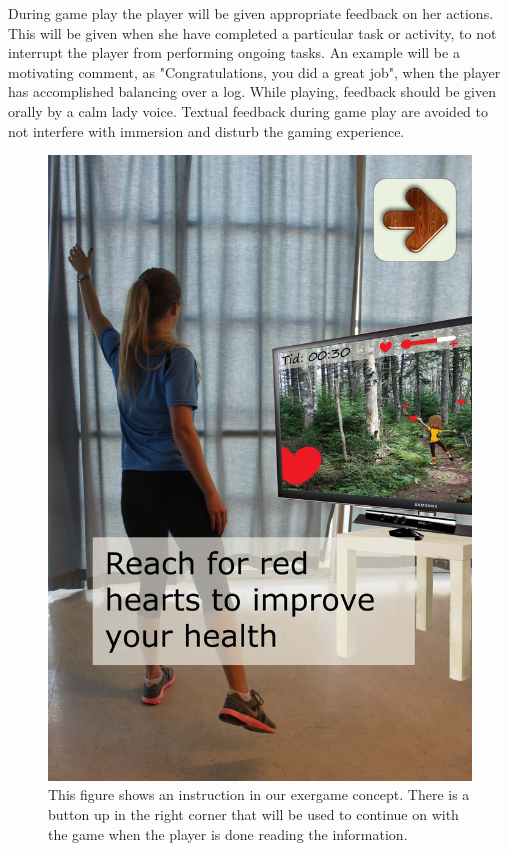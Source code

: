 During game play the player will be given appropriate feedback on her actions. This will be given when she have completed a particular task or activity, to not interrupt the player from performing ongoing tasks. An example will be a motivating comment, as "Congratulations, you did a great job", when the player has accomplished balancing over a log. While playing, feedback should be given orally by a calm lady voice. Textual feedback during game play are avoided to not interfere with immersion and disturb the gaming experience.  

\begin{figure} [H]
\centering
\includegraphics[scale=0.18]{introKineEng.jpg}
\caption[Instruction]{This figure shows an instruction in our exergame concept. There is a button up in the right corner that will be used to continue on with the game when the player is done reading the information.}
\label{fig:kineintro}
\end{figure}

